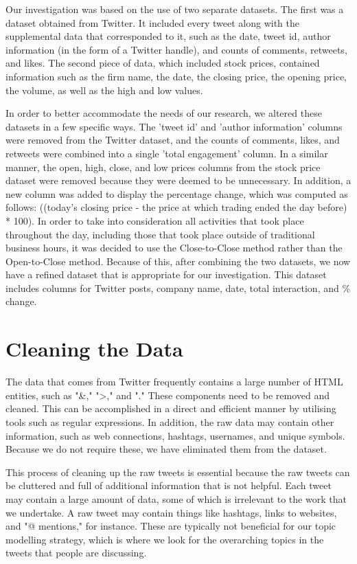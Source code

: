 \documentclass[12pt, a4paper,twoside]{report}
\theoremstyle{plain} %
\theoremstyle{definition} %
\theoremstyle{remark} %
\numberwithin{equation}{chapter}
\begin{document}
Our investigation was based on the use of two separate datasets. The first was a dataset obtained from Twitter. It included every tweet along with the supplemental data that corresponded to it, such as the date, tweet id, author information (in the form of a Twitter handle), and counts of comments, retweets, and likes. The second piece of data, which included stock prices, contained information such as the firm name, the date, the closing price, the opening price, the volume, as well as the high and low values.

In order to better accommodate the needs of our research, we altered these datasets in a few specific ways. The 'tweet id' and 'author information' columns were removed from the Twitter dataset, and the counts of comments, likes, and retweets were combined into a single 'total engagement' column. In a similar manner, the open, high, close, and low prices columns from the stock price dataset were removed because they were deemed to be unnecessary. In addition, a new column was added to display the percentage change, which was computed as follows: ((today's closing price - the price at which trading ended the day before) * 100). In order to take into consideration all activities that took place throughout the day, including those that took place outside of traditional business hours, it was decided to use the Close-to-Close method rather than the Open-to-Close method. Because of this, after combining the two datasets, we now have a refined dataset that is appropriate for our investigation. This dataset includes columns for Twitter posts, company name, date, total interaction, and \% change.

    \section{Cleaning the Data}
The data that comes from Twitter frequently contains a large number of HTML entities, such as "\&," ">," and "." These components need to be removed and cleaned. This can be accomplished in a direct and efficient manner by utilising tools such as regular expressions. In addition, the raw data may contain other information, such as web connections, hashtags, usernames, and unique symbols. Because we do not require these, we have eliminated them from the dataset.

This process of cleaning up the raw tweets is essential because the raw tweets can be cluttered and full of additional information that is not helpful. Each tweet may contain a large amount of data, some of which is irrelevant to the work that we undertake. A raw tweet may contain things like hashtags, links to websites, and "@ mentions," for instance. These are typically not beneficial for our topic modelling strategy, which is where we look for the overarching topics in the tweets that people are discussing. 
\end{document}
